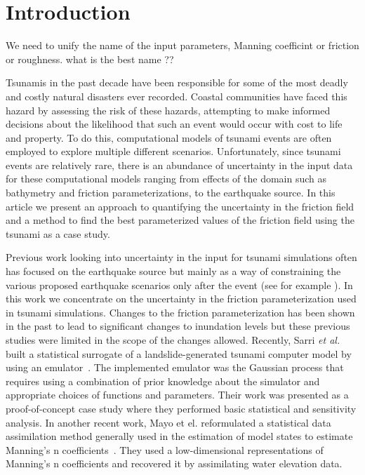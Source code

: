 
\section{Introduction}
\alert{We need to unify the name of the input parameters, Manning coefficint or friction or roughness.
what is the best name ??}

Tsunamis in the past decade have been responsible for some of the most deadly and costly natural disasters ever recorded.  Coastal communities have faced this hazard by assessing the risk of these hazards, attempting to make informed decisions about the likelihood that such an event would occur with cost to life and property.  To do this, computational models of tsunami events are often employed to explore multiple different scenarios.  Unfortunately, since tsunami events are relatively rare, there is an abundance of uncertainty in the input data for these computational models ranging from effects of the domain such as bathymetry and friction parameterizations, to the earthquake source.  In this article we present an approach to quantifying the uncertainty in the friction field and a method to find the best parameterized values of the friction field using the \tohoku tsunami as a case study.

Previous work looking into uncertainty in the input for tsunami simulations often has focused on the earthquake source but mainly as a way of constraining the various proposed earthquake scenarios only after the event (see for example \cite{MacInnes:2013cr}).  In this work we concentrate on the uncertainty in the friction parameterization used in tsunami simulations.  Changes to the friction parameterization has been shown in the past to lead to significant changes to inundation levels \cite{Myers:2001el,Jakeman:2010hk} but these previous studies were limited in the scope of the changes allowed.  Recently, Sarri \emph{et al.} built a statistical surrogate of a landslide-generated tsunami computer model by using an emulator~\cite{Sarri2012}. The implemented emulator was the Gaussian process
that requires using a combination of prior knowledge about the simulator and
appropriate choices of functions and parameters. Their work was presented as a proof-of-concept case study
where they performed basic statistical and sensitivity analysis.
In another recent work, Mayo et el. reformulated a statistical data assimilation method generally used in the estimation of model states to estimate Manning’s n coefficients~\cite{Mayo2013}. 
They used a low-dimensional representations of Manning’s n coefficients and recovered it by assimilating
water elevation data.

